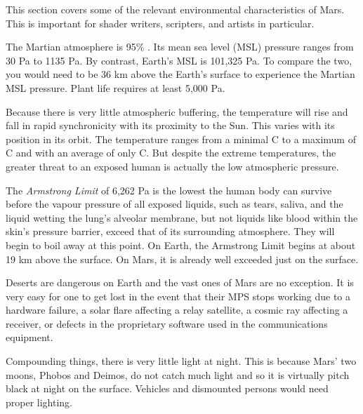 

This section covers some of the relevant environmental characteristics of Mars. This is important for shader writers, scripters, and artists in particular.

The Martian atmosphere is 95\% . Its mean sea level (MSL) pressure ranges from 30 Pa to 1135 Pa. By contrast, Earth's MSL is 101,325 Pa. To compare the two, you would need to be 36 km above the Earth's surface to experience the Martian MSL pressure. Plant life requires at least 5,000 Pa.

Because there is very little atmospheric buffering, the temperature will rise and fall in rapid synchronicity with its proximity to the Sun. This varies with its position in its orbit. The temperature ranges from a minimal C to a maximum of C and with an average of only C. But despite the extreme temperatures, the greater threat to an exposed human is actually the low atmospheric pressure.

The {\it Armstrong Limit} of 6,262 Pa is the lowest the human body can survive before the vapour pressure of all exposed liquids, such as tears, saliva, and the liquid wetting the lung's alveolar membrane, but not liquids like blood within the skin's pressure barrier, exceed that of its surrounding atmosphere. They will begin to boil away at this point. On Earth, the Armstrong Limit begins at about 19 km above the surface. On Mars, it is already well exceeded just on the surface.

Deserts are dangerous on Earth and the vast ones of Mars are no exception. It is very easy for one to get lost in the event that their MPS stops working due to a hardware failure, a solar flare affecting a relay satellite, a cosmic ray affecting a receiver, or defects in the proprietary software used in the communications equipment.

Compounding things, there is very little light at night. This is because Mars' two moons, Phobos and Deimos, do not catch much light and so it is virtually pitch black at night on the surface. Vehicles and dismounted persons would need proper lighting.

